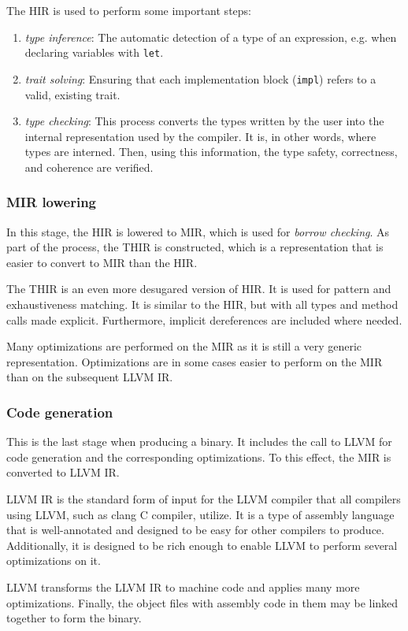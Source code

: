 \documentclass[../Thesis.tex]{subfiles}
\begin{document}
The HIR is used to perform some important steps:

\begin{enumerate}
      \item \emph{type inference}: The automatic detection of a type
            of an expression, e.g. when declaring variables with \texttt{let}.
      \item \emph{trait solving}: Ensuring that each implementation block (\texttt{impl})
            refers to a valid, existing trait.
      \item \emph{type checking}: This process converts the types written by the user
            into the internal representation used by the compiler.
            It is, in other words, where types are interned.
            Then, using this information, the type safety, correctness, and coherence are verified.
\end{enumerate}

\subsubsection{MIR lowering}

In this stage, the HIR is lowered to \acrfull{MIR},
which is used for \emph{borrow checking}.
As part of the process, the \acrfull{THIR} is constructed,
which is a representation that is easier to convert to MIR than the HIR.

The THIR is an even more desugared version of HIR.
It is used for pattern and exhaustiveness matching.
It is similar to the HIR, but with all types and method calls made explicit.
Furthermore, implicit dereferences are included where needed.

Many optimizations are performed on the MIR
as it is still a very generic representation.
Optimizations are in some cases easier
to perform on the MIR than on the subsequent LLVM IR.

\subsubsection{Code generation}

This is the last stage when producing a binary.
It includes the call to LLVM for code generation
and the corresponding optimizations.
To this effect, the MIR is converted to LLVM IR.

LLVM IR is the standard form of input for the LLVM compiler
that all compilers using LLVM, such as clang C compiler, utilize.
It is a type of assembly language that is well-annotated
and designed to be easy for other compilers to produce.
Additionally, it is designed to be rich enough to enable LLVM
to perform several optimizations on it.

LLVM transforms the LLVM IR to machine code
and applies many more optimizations.
Finally, the object files with assembly code in them may be
linked together to form the binary.
\end{document}
